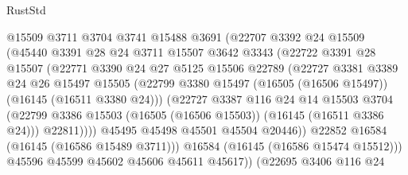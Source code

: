 \begin{lexlean}{RustStd}
\begin{coremodule}
                      @15509
                      @3711
                      @3704
                      @3741
                      @15488
                      @3691
                      (@22707
                        @3392
                        @24
                        @15509
                        (@45440
                          @3391
                          @28
                          @24
                          @3711
                          @15507
                          @3642
                          @3343
                          (@22722
                            @3391
                            @28
                            @15507
                            (@22771
                              @3390
                              @24
                              @27
                              @5125
                              @15506
                              @22789
                              (@22727
                                @3381
                                @3389
                                @24
                                @26
                                @15497
                                @15505
                                (@22799
                                  @3380
                                  @15497
                                  (@16505 (@16506 @15497))
                                  (@16145 (@16511 @3380 @24)))
                                (@22727
                                  @3387
                                  @116
                                  @24
                                  @14
                                  @15503
                                  @3704
                                  (@22799
                                    @3386
                                    @15503
                                    (@16505 (@16506 @15503))
                                    (@16145 (@16511 @3386 @24)))
                                  @22811))))
                          @45495
                          @45498
                          @45501
                          @45504
                          @20446))
                      @22852
                      @16584
                      (@16145 (@16586 @15489 @3711)))
                    @16584
                    (@16145 (@16586 @15474 @15512)))
                  @45596
                  @45599
                  @45602
                  @45606
                  @45611
                  @45617))
              (@22695
                @3406
                @116
                @24

\end{coremodule}
\end{lexlean}
